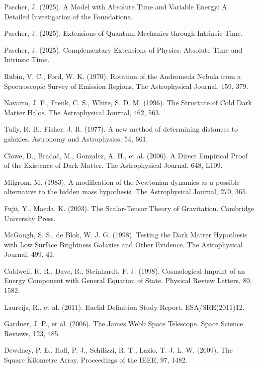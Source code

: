 \documentclass[a4paper,12pt]{article}
\begin{document}
\begin{thebibliography}{99}
	
	 Pascher, J. (2025). A Model with Absolute Time and Variable Energy: A Detailed Investigation of the Foundations.
	
	 Pascher, J. (2025). Extensions of Quantum Mechanics through Intrinsic Time.
	
	 Pascher, J. (2025). Complementary Extensions of Physics: Absolute Time and Intrinsic Time.
	
	 Rubin, V. C., Ford, W. K. (1970). Rotation of the Andromeda Nebula from a Spectroscopic Survey of Emission Regions. The Astrophysical Journal, 159, 379.
	
	 Navarro, J. F., Frenk, C. S., White, S. D. M. (1996). The Structure of Cold Dark Matter Halos. The Astrophysical Journal, 462, 563.
	
	 Tully, R. B., Fisher, J. R. (1977). A new method of determining distances to galaxies. Astronomy and Astrophysics, 54, 661.
	
	 Clowe, D., Bradač, M., Gonzalez, A. H., et al. (2006). A Direct Empirical Proof of the Existence of Dark Matter. The Astrophysical Journal, 648, L109.
	
	 Milgrom, M. (1983). A modification of the Newtonian dynamics as a possible alternative to the hidden mass hypothesis. The Astrophysical Journal, 270, 365.
	
	 Fujii, Y., Maeda, K. (2003). The Scalar-Tensor Theory of Gravitation. Cambridge University Press.
	
	 McGaugh, S. S., de Blok, W. J. G. (1998). Testing the Dark Matter Hypothesis with Low Surface Brightness Galaxies and Other Evidence. The Astrophysical Journal, 499, 41.
	
	 Caldwell, R. R., Dave, R., Steinhardt, P. J. (1998). Cosmological Imprint of an Energy Component with General Equation of State. Physical Review Letters, 80, 1582.
	
	 Laureijs, R., et al. (2011). Euclid Definition Study Report. ESA/SRE(2011)12.
	
	 Gardner, J. P., et al. (2006). The James Webb Space Telescope. Space Science Reviews, 123, 485.
	
	 Dewdney, P. E., Hall, P. J., Schilizzi, R. T., Lazio, T. J. L. W. (2009). The Square Kilometre Array. Proceedings of the IEEE, 97, 1482.
	
\end{thebibliography}	
	
\end{document}
